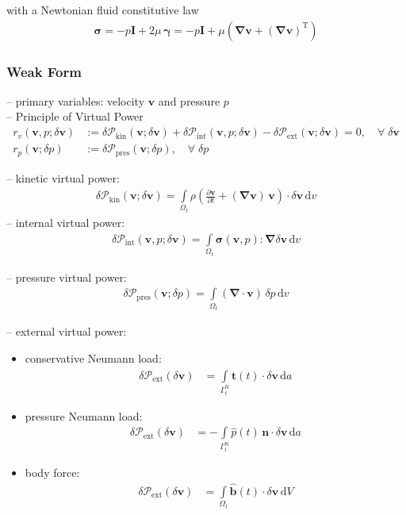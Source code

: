 \documentclass[a4paper,12pt]{report}
\newcommand{\bs}[1]{\boldsymbol{#1}}
\newcommand{\Om}{\mathit{\Omega}}
\newcommand{\Gm}{\mathit{\Gamma}}
\begin{document}
with a Newtonian fluid constitutive law
\begin{align}
\bs{\sigma} = -p \bs{I} + 2 \mu\,\bs{\gamma} = -p \bs{I} + \mu \left(\bs{\nabla} \bs{v} + (\bs{\nabla} \bs{v})^{\mathrm{T}}\right)
\end{align}

\subsubsection{Weak Form}
-- primary variables: velocity $\bs{v}$ and pressure $p$\\

-- Principle of Virtual Power
\begin{align}
r_v(\bs{v},p;\delta\bs{v}) &:= \delta \mathcal{P}_{\mathrm{kin}}(\bs{v};\delta\bs{v}) + \delta \mathcal{P}_{\mathrm{int}}(\bs{v},p;\delta\bs{v}) - \delta \mathcal{P}_{\mathrm{ext}}(\bs{v};\delta\bs{v}) = 0, \quad \forall \; \delta\bs{v} \label{eq:res_v_fluid}\\
r_p(\bs{v};\delta p) &:= \delta \mathcal{P}_{\mathrm{pres}}(\bs{v};\delta p), \quad \forall \; \delta p \label{eq:res_p_fluid}
\end{align}

-- kinetic virtual power:
\begin{align}
\delta \mathcal{P}_{\mathrm{kin}}(\bs{v};\delta\bs{v}) = \int\limits_{\Om_t} \rho\left(\frac{\partial\bs{v}}{\partial t} + (\bs{\nabla}\bs{v})\,\bs{v}\right) \cdot \delta\bs{v} \,\mathrm{d}v
\end{align}
-- internal virtual power:
\begin{align}
\delta \mathcal{P}_{\mathrm{int}}(\bs{v},p;\delta\bs{v}) = 
\int\limits_{\Om_t} \bs{\sigma}(\bs{v},p) : \bs{\nabla} \delta\bs{v} \,\mathrm{d}v 
\end{align}

-- pressure virtual power:
\begin{align}
\delta \mathcal{P}_{\mathrm{pres}}(\bs{v};\delta p) = 
\int\limits_{\Om_t} (\bs{\nabla}\cdot\bs{v})\,\delta p\,\mathrm{d}v
\end{align}

-- external virtual power:\\
\begin{itemize}
\item conservative Neumann load:
\begin{align}
\delta \mathcal{P}_{\mathrm{ext}}(\delta\bs{v}) &= \int\limits_{\Gm_t^{\mathrm{N}}} \hat{\bs{t}}(t) \cdot \delta\bs{v} \,\mathrm{d}a \label{eq:deltaPext_neumann}
\end{align}
\item pressure Neumann load:
\begin{align}
\delta \mathcal{P}_{\mathrm{ext}}(\delta\bs{v}) &= -\int\limits_{\Gm_t^{\mathrm{N}}} \hat{p}(t)\,\bs{n} \cdot \delta\bs{v} \,\mathrm{d}a \label{eq:deltaPext_neumann}
\end{align}
\item body force:
\begin{align}
\delta \mathcal{P}_{\mathrm{ext}}(\delta\bs{v}) &= \int\limits_{\Om_t} \hat{\bs{b}}(t) \cdot \delta\bs{v} \,\mathrm{d}V \label{eq:deltaPext_body}
\end{align}
\end{itemize}
\end{document}
